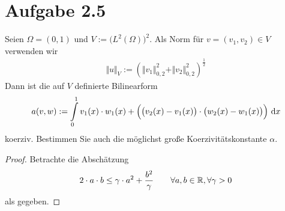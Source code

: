 \documentclass[12pt,a4paper]{article}
\begin{document}
\section*{Aufgabe 2.5}
Seien $\Omega=(0,1)$ und $V:=\big(L^2(\Omega)\big)^2$. Als Norm für $v=(v_1,v_2)\in V$ verwenden wir
\begin{align*}
\Vert u\Vert_V:=\left(\Vert v_1\Vert_{0,2}^2+\Vert v_2\Vert^2_{0,2}\right)^{\frac{1}{2}}
\end{align*}
Dann ist die auf $V$ definierte Bilinearform
\begin{align*}
a(v,w):=\int\limits_0^1 v_1(x)\cdot w_1(x)+\Big(\big(v_2(x)-v_1(x)\big)\cdot\big(w_2(x)-w_1(x)\big)\Big)\text{ d} x
\end{align*}
koerziv. Bestimmen Sie auch die möglichst große Koerzivitätskonstante $\alpha$.

\begin{proof}
Betrachte die Abschätzung
\begin{align}\label{Hinweis2.5}
2\cdot a\cdot b\leq\gamma\cdot a^2+\frac{b^2}{\gamma}\qquad\forall a,b\in\mathbb{R},\forall\gamma>0
\end{align}
als gegeben.


\end{proof}
\end{document}
